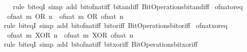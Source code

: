 \begin{isabellebody}
%
\isadelimproof
\ \ %
\endisadelimproof
%
\isatagproof
{}\isamarkupfalse%
\ {\isacharparenleft}{\kern0pt}rule\ bit{\isacharunderscore}{\kern0pt}eqI{\isacharparenright}{\kern0pt}\ {\isacharparenleft}{\kern0pt}simp\ add{\isacharcolon}{\kern0pt}\ bit{\isacharunderscore}{\kern0pt}of{\isacharunderscore}{\kern0pt}nat{\isacharunderscore}{\kern0pt}iff\ bit{\isacharunderscore}{\kern0pt}and{\isacharunderscore}{\kern0pt}iff\ Bit{\isacharunderscore}{\kern0pt}Operations{\isachardot}{\kern0pt}bit{\isacharunderscore}{\kern0pt}and{\isacharunderscore}{\kern0pt}iff{\isacharparenright}{\kern0pt}%
\endisatagproof
{\isafoldproof}%
%
\isadelimproof
\isanewline
%
\endisadelimproof
\isanewline
{}\isamarkupfalse%
\ of{\isacharunderscore}{\kern0pt}nat{\isacharunderscore}{\kern0pt}or{\isacharunderscore}{\kern0pt}eq{\isacharcolon}{\kern0pt}\isanewline
\ \ {\isacartoucheopen}of{\isacharunderscore}{\kern0pt}nat\ {\isacharparenleft}{\kern0pt}m\ OR\ n{\isacharparenright}{\kern0pt}\ {\isacharequal}{\kern0pt}\ of{\isacharunderscore}{\kern0pt}nat\ m\ OR\ of{\isacharunderscore}{\kern0pt}nat\ n{\isacartoucheclose}\isanewline
%
\isadelimproof
\ \ %
\endisadelimproof
%
\isatagproof
{}\isamarkupfalse%
\ {\isacharparenleft}{\kern0pt}rule\ bit{\isacharunderscore}{\kern0pt}eqI{\isacharparenright}{\kern0pt}\ {\isacharparenleft}{\kern0pt}simp\ add{\isacharcolon}{\kern0pt}\ bit{\isacharunderscore}{\kern0pt}of{\isacharunderscore}{\kern0pt}nat{\isacharunderscore}{\kern0pt}iff\ bit{\isacharunderscore}{\kern0pt}or{\isacharunderscore}{\kern0pt}iff\ Bit{\isacharunderscore}{\kern0pt}Operations{\isachardot}{\kern0pt}bit{\isacharunderscore}{\kern0pt}or{\isacharunderscore}{\kern0pt}iff{\isacharparenright}{\kern0pt}%
\endisatagproof
{\isafoldproof}%
%
\isadelimproof
\isanewline
%
\endisadelimproof
\isanewline
{}\isamarkupfalse%
\ of{\isacharunderscore}{\kern0pt}nat{\isacharunderscore}{\kern0pt}xor{\isacharunderscore}{\kern0pt}eq{\isacharcolon}{\kern0pt}\isanewline
\ \ {\isacartoucheopen}of{\isacharunderscore}{\kern0pt}nat\ {\isacharparenleft}{\kern0pt}m\ XOR\ n{\isacharparenright}{\kern0pt}\ {\isacharequal}{\kern0pt}\ of{\isacharunderscore}{\kern0pt}nat\ m\ XOR\ of{\isacharunderscore}{\kern0pt}nat\ n{\isacartoucheclose}\isanewline
%
\isadelimproof
\ \ %
\endisadelimproof
%
\isatagproof
{}\isamarkupfalse%
\ {\isacharparenleft}{\kern0pt}rule\ bit{\isacharunderscore}{\kern0pt}eqI{\isacharparenright}{\kern0pt}\ {\isacharparenleft}{\kern0pt}simp\ add{\isacharcolon}{\kern0pt}\ bit{\isacharunderscore}{\kern0pt}of{\isacharunderscore}{\kern0pt}nat{\isacharunderscore}{\kern0pt}iff\ bit{\isacharunderscore}{\kern0pt}xor{\isacharunderscore}{\kern0pt}iff\ Bit{\isacharunderscore}{\kern0pt}Operations{\isachardot}{\kern0pt}bit{\isacharunderscore}{\kern0pt}xor{\isacharunderscore}{\kern0pt}iff{\isacharparenright}{\kern0pt}%

\end{isabellebody}

